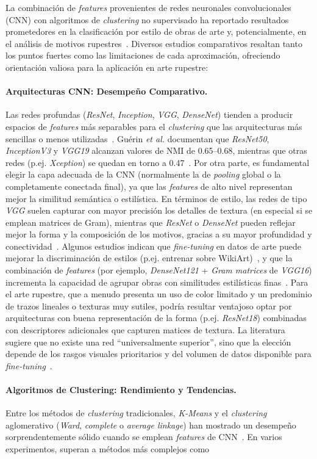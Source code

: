 La combinación de \textit{features} provenientes de redes neuronales convolucionales (CNN) con algoritmos de \textit{clustering} no supervisado ha reportado resultados prometedores en la clasificación por estilo de obras de arte y, potencialmente, en el análisis de motivos rupestres~\cite{dangeti2024,castellano2022}. Diversos estudios comparativos resaltan tanto los puntos fuertes como las limitaciones de cada aproximación, ofreciendo orientación valiosa para la aplicación en arte rupestre: \paragraph{Arquitecturas CNN: Desempeño Comparativo.} Las redes profundas (\textit{ResNet}, \textit{Inception}, \textit{VGG}, \textit{DenseNet}) tienden a producir espacios de \textit{features} más separables para el \textit{clustering} que las arquitecturas más sencillas o menos utilizadas~\cite{guerin2018}. Guérin \textit{et al.} documentan que \textit{ResNet50}, \textit{InceptionV3} y \textit{VGG19} alcanzan valores de NMI de 0.65–0.68, mientras que otras redes (p.ej. \textit{Xception}) se quedan en torno a 0.47~\cite{guerin2018}. Por otra parte, es fundamental elegir la capa adecuada de la CNN (normalmente la de \textit{pooling} global o la completamente conectada final), ya que las \textit{features} de alto nivel representan mejor la similitud semántica o estilística. En términos de estilo, las redes de tipo \textit{VGG} suelen capturar con mayor precisión los detalles de textura (en especial si se emplean matrices de Gram), mientras que \textit{ResNet} o \textit{DenseNet} pueden reflejar mejor la forma y la composición de los motivos, gracias a su mayor profundidad y conectividad~\cite{gairola2020}. Algunos estudios indican que \textit{fine-tuning} en datos de arte puede mejorar la discriminación de estilos (p.ej. entrenar sobre WikiArt)~\cite{sanakoyeu2018}, y que la combinación de \textit{features} (por ejemplo, \textit{DenseNet121} + \textit{Gram matrices} de \textit{VGG16}) incrementa la capacidad de agrupar obras con similitudes estilísticas finas~\cite{dangeti2024}. Para el arte rupestre, que a menudo presenta un uso de color limitado y un predominio de trazos lineales o texturas muy sutiles, podría resultar ventajoso optar por arquitecturas con buena representación de la forma (p.ej. \textit{ResNet18}) combinadas con descriptores adicionales que capturen matices de textura. La literatura sugiere que no existe una red “universalmente superior”, sino que la elección depende de los rasgos visuales prioritarios y del volumen de datos disponible para \textit{fine-tuning}~\cite{guerin2018,gairola2020}. \paragraph{Algoritmos de Clustering: Rendimiento y Tendencias.} Entre los métodos de \textit{clustering} tradicionales, \textit{K-Means} y el \textit{clustering} aglomerativo (\textit{Ward}, \textit{complete} o \textit{average linkage}) han mostrado un desempeño sorprendentemente sólido cuando se emplean \textit{features} de CNN~\cite{gairola2020,guerin2018}. En varios experimentos, superan a métodos más complejos como 